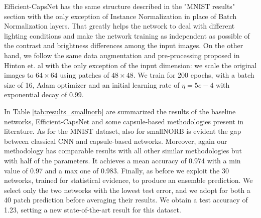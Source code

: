 \documentclass{article}
\begin{document}
Efficient-CapsNet has the same structure described in the "MNIST results" section with the only exception of Instance Normalization \cite{ulyanov2016instance} in place of Batch Normalization layers. That greatly helps the network to deal with different lighting conditions and make the network training as independent as possible of the contrast and brightness differences among the input images.
On the other hand, we follow the same data augmentation and pre-processing proposed in Hinton et. al \cite{hinton2018matrix} with the only exception of the input dimension: we scale the original images to $64 \times 64$ using patches of $48 \times 48$. We train for 200 epochs, with a batch size of 16, Adam optimizer and an initial learning rate of $\eta=5e-4$ with exponential decay of 0.99.

In Table \ref{tab:results_smallnorb} are summarized the results of the baseline networks, Efficient-CapsNet and some capsule-based methodologies present in literature. As for the MNIST dataset, also for smallNORB is evident the gap between classical CNN and capsule-based networks. Moreover, again our methodology has comparable results with all other similar methodologies but with half of the parameters. It achieves a mean accuracy of 0.974 with a min value of 0.97 and a max one of 0.983. Finally, as before we exploit the 30 networks, trained for statistical evidence, to produce an ensemble prediction. We select only the two networks with the lowest test error, and we adopt for both a 40 patch prediction \cite{hinton2018matrix} before averaging their results. We obtain a test accuracy of 1.23, setting a new state-of-the-art result for this dataset.
\end{document}
